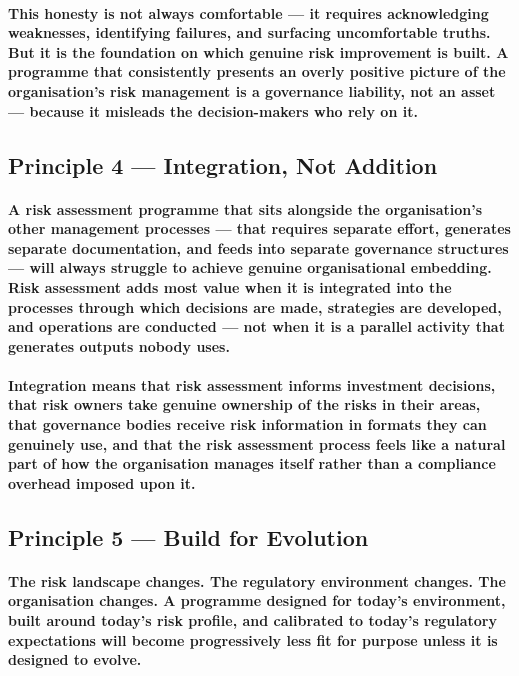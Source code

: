 \paragraph{This honesty is not always comfortable — it requires acknowledging weaknesses, identifying failures, and surfacing uncomfortable truths. But it is the foundation on which genuine risk improvement is built. A programme that consistently presents an overly positive picture of the organisation's risk management is a governance liability, not an asset — because it misleads the decision-makers who rely on it.}

\subsection{Principle 4 — Integration, Not Addition}
\paragraph{A risk assessment programme that sits alongside the organisation's other management processes — that requires separate effort, generates separate documentation, and feeds into separate governance structures — will always struggle to achieve genuine organisational embedding. Risk assessment adds most value when it is integrated into the processes through which decisions are made, strategies are developed, and operations are conducted — not when it is a parallel activity that generates outputs nobody uses.}
\paragraph{Integration means that risk assessment informs investment decisions, that risk owners take genuine ownership of the risks in their areas, that governance bodies receive risk information in formats they can genuinely use, and that the risk assessment process feels like a natural part of how the organisation manages itself rather than a compliance overhead imposed upon it.}

\subsection{Principle 5 — Build for Evolution}
\paragraph{The risk landscape changes. The regulatory environment changes. The organisation changes. A programme designed for today's environment, built around today's risk profile, and calibrated to today's regulatory expectations will become progressively less fit for purpose unless it is designed to evolve.}
